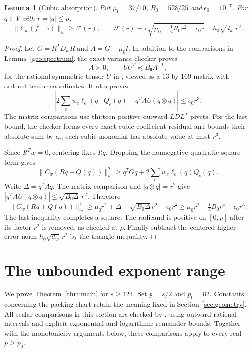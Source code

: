 \documentclass[12pt,reqno]{amsart}
\newtheorem{lemma}[theorem]{Lemma}
\theoremstyle{definition}
\numberwithin{equation}{section}
\begin{document}
\begin{lemma}[Cubic absorption]\label{geo:newvariance}
Put $\mu_0=37/10$, $B_0=528/25$ and $\epsilon_0=10^{-7}$. For
$q\in V$ with $r=|q|\le\rho$,
\begin{equation}\label{geo:variancelower}
 \|C_w(f-\tau)\|_w\ge\mathcal F(r),\qquad
 \mathcal F(r)=r\sqrt{\mu_0-\tfrac14B_0r^2-\epsilon_0r}
                         -h_0\sqrt{d_w}\,r^2.
\end{equation}
\end{lemma}
\begin{proof}
Let $G=R^TD_wR$ and $A=G-\mu_0I$. In addition to the comparisons in
Lemma~\ref{geo:spectrum}, the exact variance checker proves
\[
 A\succ0,\qquad UU^T\preceq B_0A^{-1},
\]
for the rational symmetric tensor $U$ in
, viewed as a
$13$-by-$169$ matrix with ordered tensor coordinates. It also proves
\[
 \left|2\sum_ew_e\ell_e(q)Q_e(q)
       -q^TAU(q\otimes q)\right|\le\epsilon_0r^3.
\]
The matrix comparisons use thirteen positive outward $LDL^T$ pivots.
For the last bound, the checker forms every exact cubic coefficient
residual and bounds their absolute sum by $\epsilon_0$; each cubic
monomial has absolute value at most $r^3$.

Since $R^Tw=0$, centering fixes $Rq$. Dropping the nonnegative
quadratic-square term gives
\[
 \|C_w(Rq+Q(q))\|_w^2
 \ge q^TGq+2\sum_ew_e\ell_e(q)Q_e(q).
\]
Write $\Delta=q^TAq$. The matrix comparison and
$|q\otimes q|=r^2$ give
$|q^TAU(q\otimes q)|\le\sqrt{B_0\Delta}\,r^2$. Therefore
\[
 \|C_w(Rq+Q(q))\|_w^2
 \ge\mu_0r^2+\Delta-\sqrt{B_0\Delta}\,r^2-\epsilon_0r^3
 \ge\mu_0r^2-\tfrac14B_0r^4-\epsilon_0r^3.
\]
The last inequality completes a square. The radicand is positive
on $[0,\rho]$ after its factor $r^2$ is removed, as checked at
$\rho$. Finally subtract the centered higher-error norm
$h_0\sqrt{d_w}\,r^2$ by the triangle inequality.
\end{proof}

\section{The unbounded exponent range}\label{sec:tail}
We prove Theorem~\ref{thm:main} for $s\ge124$. Set $p=s/2$ and
$p_0=62$. Constants concerning the packing chart retain the meaning
fixed in Section~\ref{sec:geometry}.
All scalar comparisons in this section are checked by
, using outward rational
intervals and explicit exponential and logarithmic remainder bounds.
Together with the monotonicity arguments below, these comparisons apply
to every real $p\ge p_0$.
\end{document}
